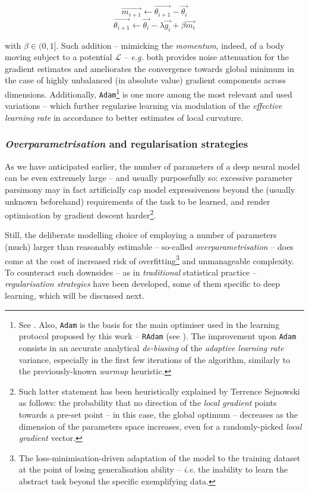 $$\vec{m_{i+1}} \leftarrow  \vec{\theta_{i+1}} - \vec{\theta_{i}}$$
$$\vec{\theta_{i+1}} \leftarrow  \vec{\theta_{i}} - \lambda\vec{g_i} + \beta\vec{m_i}$$

with $\beta \in (0,1]$. Such addition -- mimicking the \textit{momentum}, indeed, of a body moving subject to a potential $\mathcal{L}$ -- \textit{e.g.} both provides noise attenuation for the gradient estimates and ameliorates the convergence towards global minimum in the case of highly unbalanced (in absolute value) gradient components across dimensions. Additionally, \texttt{Adam}\footnote{See \cite{KingmaBa2015Adam}. Also, \texttt{Adam} is the basis for the main optimiser used in the learning protocol proposed by this work -- \texttt{RAdam} (see \cite{LiuEtAl2020OnTheVariance}). The improvement upon \texttt{Adam} consists in an accurate analytical \textit{de-biasing} of the \textit{adaptive learning rate} variance, especially in the first few iterations of the algorithm, similarly to the previously-known \textit{warmup} heuristic.} is one more among the most relevant and used variations -- which further regularise learning via modulation of the \textit{effective learning rate} in accordance to better estimates of local curvature.

\subsubsection{\textit{Overparametrisation} and regularisation strategies}

As we have anticipated earlier, the number of parameters of a deep neural model can be even extremely large -- and usually purposefully so: excessive parameter parsimony may in fact artificially cap model expressiveness beyond the (usually unknown beforehand) requirements of the task to be learned, and render optimisation by gradient descent harder\footnote{Such latter statement has been heuristically explained by Terrence Sejnowski as follows: the probability that no direction of the \textit{local gradient} points towards a pre-set point -- in this case, the global optimum -- decreases as the dimension of the parameters space increases, even for a randomly-picked \textit{local gradient} vector.}.

Still, the deliberate modelling choice of employing a number of parameters (much) larger than reasonably estimable -- so-called \textit{overparametrisation} -- does come at the cost of increased risk of overfitting\footnote{The loss-minimisation-driven adaptation of the model to the training dataset at the point of losing generalisation ability -- \textit{i.e.} the inability to learn the abstract task beyond the specific exemplifying data.} and unmanageable complexity. To counteract such downsides -- as in \textit{traditional} statistical practice -- \textit{regularisation strategies} have been developed, some of them specific to deep learning, which will be discussed next.

